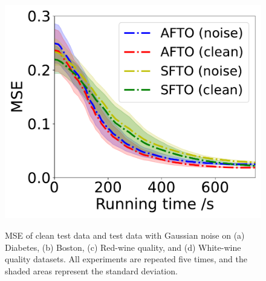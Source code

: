 \documentclass[letterpaper]{article}
\begin{document}
\begin{figure}[t]
{\begin{minipage}{4.2cm}
\label{fig:dis-red}
\includegraphics[scale=0.215]{dis-red.pdf}
\end{minipage}}
\caption{MSE of clean test data and test data with Gaussian noise
on (a) Diabetes, (b) Boston, (c) Red-wine quality, and (d) White-wine quality datasets. All experiments are repeated five times, and the shaded areas represent the standard deviation.} %
\label{fig:dis-hyper}
\end{figure}
\end{document}
